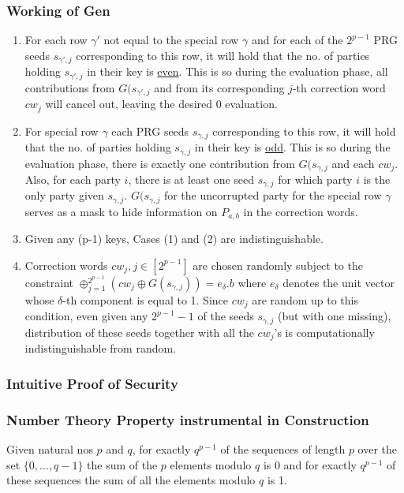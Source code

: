 \subsubsection{Working of Gen}
\begin{enumerate}
    \item For each row $\gamma'$ not equal to the special row $\gamma$ and for each of the $2^{p-1}$ PRG seeds $s_{\gamma', j}$ corresponding to this row, it will hold that the no. of parties holding $s_{\gamma', j}$ in their key is \underline{even}. This is so during the evaluation phase, all contributions from $G(s_{\gamma', j}$ and from its corresponding $j$-th correction word $cw_j$ will cancel out, leaving the desired 0 evaluation. 
    \item For special row $\gamma$ each PRG seeds $s_{\gamma, j}$ corresponding to this row, it will hold that the no. of parties holding $s_{\gamma, j}$ in their key is \underline{odd}. This is so during the evaluation phase, there is exactly one contribution from $G(s_{\gamma, j}$ and each $cw_j$. Also, for each party $i$, there is at least one seed $s_{\gamma, j}$ for which party $i$ is the only party given $s_{\gamma, j}$. $G(s_{\gamma, j}$ for the uncorrupted party for the special row $\gamma$ serves as a mask to hide information on $P_{a, b}$ in the correction words.
    \item Given any (p-1) keys, Cases (1) and (2) are indistinguishable.
    \item Correction words $cw_j, j \in [2^{p-1}]$ are chosen randomly subject to the constraint $\oplus_{j=1}^{2^{p-1}}(cw_j \oplus G(s_{\gamma, j})) = e_\delta.b$ where $e_\delta$ denotes the unit vector whose $\delta$-th component is equal to 1. Since $cw_j$ are random up to this condition, even given any $2^{p-1}-1$ of the seeds $s_{\gamma, j}$ (but with one missing), distribution of these seeds together with all the $cw_j$'s is computationally indistinguishable from random.
\end{enumerate}

\subsubsection{Intuitive Proof of Security}

\subsubsection{Number Theory Property instrumental in Construction}
Given natural nos $p$ and $q$, for exactly $q^{p-1}$ of the sequences of length $p$ over the set $\{0, ..., q-1\}$ the sum of the $p$ elements modulo $q$ is 0 and for exactly $q^{p-1}$ of these sequences the sum of all the elements modulo $q$ is 1.

